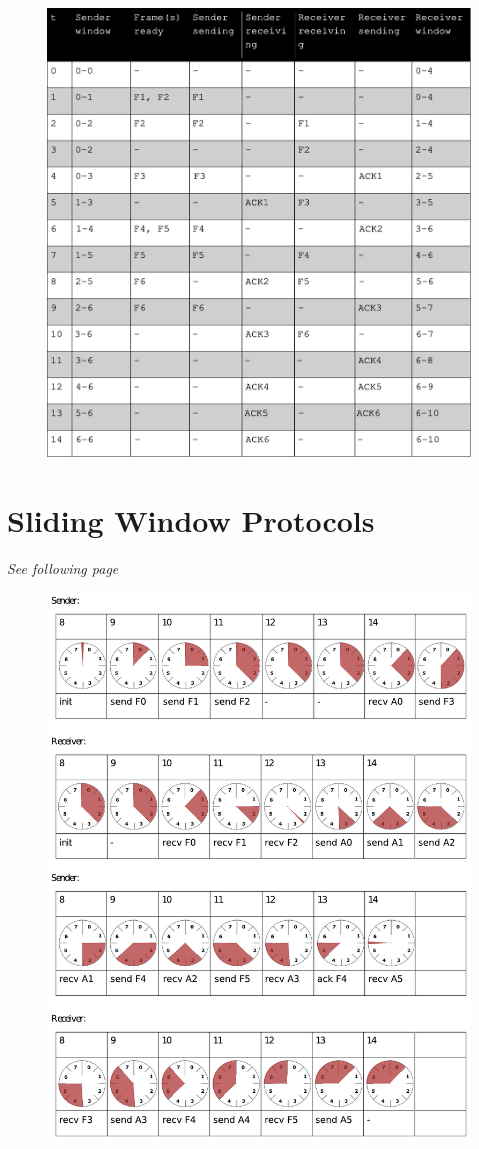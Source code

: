 \documentclass[a4paper, 11 pt, article, accentcolor=tud7b]{tudreport}
\begin{document}
	\begin{figure}[h]
		\centering
		\includegraphics[]{table1.pdf}
	\end{figure}

	\FloatBarrier
	
	\section{Sliding Window Protocols}
	
	\textit{See following page}

	\begin{figure}[h]
		\centering
		\includegraphics[]{table2.pdf}
	\end{figure}
	
\end{document}
